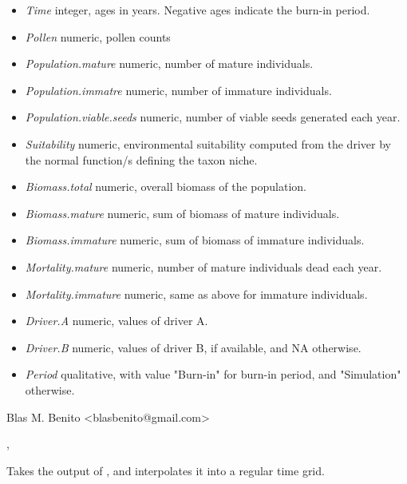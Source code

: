 \documentclass[letterpaper]{book}
\begin{document}
\begin{Details}\relax
\begin{itemize}

\item \emph{Time} integer, ages in years. Negative ages indicate the burn-in period.
\item \emph{Pollen} numeric, pollen counts
\item \emph{Population.mature} numeric, number of mature individuals.
\item \emph{Population.immatre} numeric, number of immature individuals.
\item \emph{Population.viable.seeds} numeric, number of viable seeds generated each year.
\item \emph{Suitability} numeric, environmental suitability computed from the driver by the normal function/s defining the taxon niche.
\item \emph{Biomass.total} numeric, overall biomass of the population.
\item \emph{Biomass.mature} numeric, sum of biomass of mature individuals.
\item \emph{Biomass.immature} numeric, sum of biomass of immature individuals.
\item \emph{Mortality.mature} numeric, number of mature individuals dead each year.
\item \emph{Mortality.immature} numeric, same as above for immature individuals.
\item \emph{Driver.A} numeric, values of driver A.
\item \emph{Driver.B} numeric, values of driver B, if available, and NA otherwise.
\item \emph{Period} qualitative, with value "Burn-in" for burn-in period, and "Simulation" otherwise.

\end{itemize}

\end{Details}
%
\begin{Author}\relax
Blas M. Benito  <blasbenito@gmail.com>
\end{Author}
%
\begin{SeeAlso}\relax
{}, 
\end{SeeAlso}
%
\begin{Description}\relax
Takes the output of , and interpolates it into a regular time grid.
\end{Description}
\end{document}
